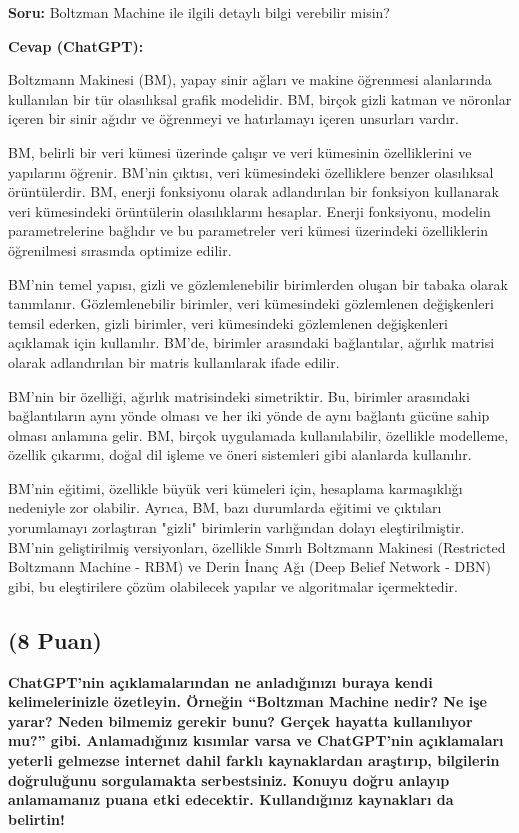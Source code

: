 \documentclass[11pt]{article}
\begin{document}
\textbf{Soru:} Boltzman Machine ile ilgili detaylı bilgi verebilir misin?

\textbf{Cevap (ChatGPT):}

Boltzmann Makinesi (BM), yapay sinir ağları ve makine öğrenmesi alanlarında kullanılan bir tür olasılıksal grafik modelidir. BM, birçok gizli katman ve nöronlar içeren bir sinir ağıdır ve öğrenmeyi ve hatırlamayı içeren unsurları vardır.

BM, belirli bir veri kümesi üzerinde çalışır ve veri kümesinin özelliklerini ve yapılarını öğrenir. BM'nin çıktısı, veri kümesindeki özelliklere benzer olasılıksal örüntülerdir. BM, enerji fonksiyonu olarak adlandırılan bir fonksiyon kullanarak veri kümesindeki örüntülerin olasılıklarını hesaplar. Enerji fonksiyonu, modelin parametrelerine bağlıdır ve bu parametreler veri kümesi üzerindeki özelliklerin öğrenilmesi sırasında optimize edilir.

BM'nin temel yapısı, gizli ve gözlemlenebilir birimlerden oluşan bir tabaka olarak tanımlanır. Gözlemlenebilir birimler, veri kümesindeki gözlemlenen değişkenleri temsil ederken, gizli birimler, veri kümesindeki gözlemlenen değişkenleri açıklamak için kullanılır. BM'de, birimler arasındaki bağlantılar, ağırlık matrisi olarak adlandırılan bir matris kullanılarak ifade edilir.

BM'nin bir özelliği, ağırlık matrisindeki simetriktir. Bu, birimler arasındaki bağlantıların aynı yönde olması ve her iki yönde de aynı bağlantı gücüne sahip olması anlamına gelir. BM, birçok uygulamada kullanılabilir, özellikle modelleme, özellik çıkarımı, doğal dil işleme ve öneri sistemleri gibi alanlarda kullanılır.

BM'nin eğitimi, özellikle büyük veri kümeleri için, hesaplama karmaşıklığı nedeniyle zor olabilir. Ayrıca, BM, bazı durumlarda eğitimi ve çıktıları yorumlamayı zorlaştıran "gizli" birimlerin varlığından dolayı eleştirilmiştir. BM'nin geliştirilmiş versiyonları, özellikle Sınırlı Boltzmann Makinesi (Restricted Boltzmann Machine - RBM) ve Derin İnanç Ağı (Deep Belief Network - DBN) gibi, bu eleştirilere çözüm olabilecek yapılar ve algoritmalar içermektedir.

\subsection{(8 Puan)} \textbf{ChatGPT’nin açıklamalarından ne anladığınızı buraya kendi kelimelerinizle özetleyin. Örneğin ``Boltzman Machine nedir? Ne işe yarar? Neden bilmemiz gerekir bunu? Gerçek hayatta kullanılıyor mu?'' gibi. Anlamadığınız kısımlar varsa ve ChatGPT’nin açıklamaları yeterli gelmezse internet dahil farklı kaynaklardan araştırıp, bilgilerin doğruluğunu sorgulamakta serbestsiniz. Konuyu doğru anlayıp anlamamanız puana etki edecektir. Kullandığınız kaynakları da belirtin!}
\end{document}
